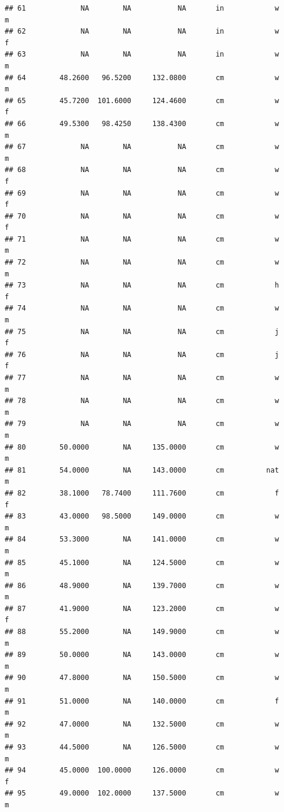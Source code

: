 \documentclass[]{article}
\begin{document}
\begin{verbatim}
## 61             NA        NA           NA       in            w         m
## 62             NA        NA           NA       in            w         f
## 63             NA        NA           NA       in            w         m
## 64        48.2600   96.5200     132.0800       cm            w         m
## 65        45.7200  101.6000     124.4600       cm            w         f
## 66        49.5300   98.4250     138.4300       cm            w         m
## 67             NA        NA           NA       cm            w         m
## 68             NA        NA           NA       cm            w         f
## 69             NA        NA           NA       cm            w         f
## 70             NA        NA           NA       cm            w         f
## 71             NA        NA           NA       cm            w         m
## 72             NA        NA           NA       cm            w         m
## 73             NA        NA           NA       cm            h         f
## 74             NA        NA           NA       cm            w         m
## 75             NA        NA           NA       cm            j         f
## 76             NA        NA           NA       cm            j         f
## 77             NA        NA           NA       cm            w         m
## 78             NA        NA           NA       cm            w         m
## 79             NA        NA           NA       cm            w         m
## 80        50.0000        NA     135.0000       cm            w         m
## 81        54.0000        NA     143.0000       cm          nat         m
## 82        38.1000   78.7400     111.7600       cm            f         f
## 83        43.0000   98.5000     149.0000       cm            w         m
## 84        53.3000        NA     141.0000       cm            w         m
## 85        45.1000        NA     124.5000       cm            w         m
## 86        48.9000        NA     139.7000       cm            w         m
## 87        41.9000        NA     123.2000       cm            w         f
## 88        55.2000        NA     149.9000       cm            w         m
## 89        50.0000        NA     143.0000       cm            w         m
## 90        47.8000        NA     150.5000       cm            w         m
## 91        51.0000        NA     140.0000       cm            f         m
## 92        47.0000        NA     132.5000       cm            w         m
## 93        44.5000        NA     126.5000       cm            w         m
## 94        45.0000  100.0000     126.0000       cm            w         f
## 95        49.0000  102.0000     137.5000       cm            w         m

\end{verbatim}
\end{document}
